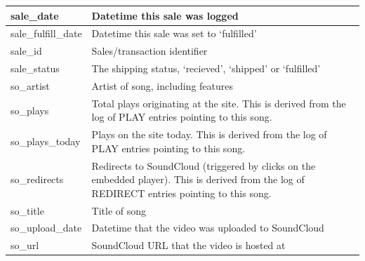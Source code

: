 \documentclass[11pt, a4paper]{report}
\begin{document}
\begin{longtable}{|l|p{10cm}|}
sale\_date              & Datetime this sale was logged                                                                                                                                         \\ \hline
sale\_fulfill\_date     & Datetime this sale was set to `fulfilled'                                                                                                                                 \\ \hline
sale\_id                & Sales/transaction identifier                                                                                                                                          \\ \hline
sale\_status            & The shipping status, `recieved', `shipped' or `fulfilled'                                                                                                             \\ \hline
so\_artist              & Artist of song, including features                                                                                                                                    \\ \hline
so\_plays               & Total plays originating at the site. This is derived from the log of PLAY entries pointing to this song.                                                              \\ \hline
so\_plays\_today        & Plays on the site today. This is derived from the log of PLAY entries pointing to this song.                                                                          \\ \hline
so\_redirects           & Redirects to SoundCloud (triggered by clicks on the embedded player). This is derived from the log of REDIRECT entries pointing to this song.                         \\ \hline
so\_title               & Title of song                                                                                                                                                         \\ \hline
so\_upload\_date        & Datetime that the video was uploaded to SoundCloud                                                                                                                   \\ \hline
so\_url                 & SoundCloud URL that the video is hosted at                                                                                                                            \\ \hline

\end{longtable}
\end{document}
